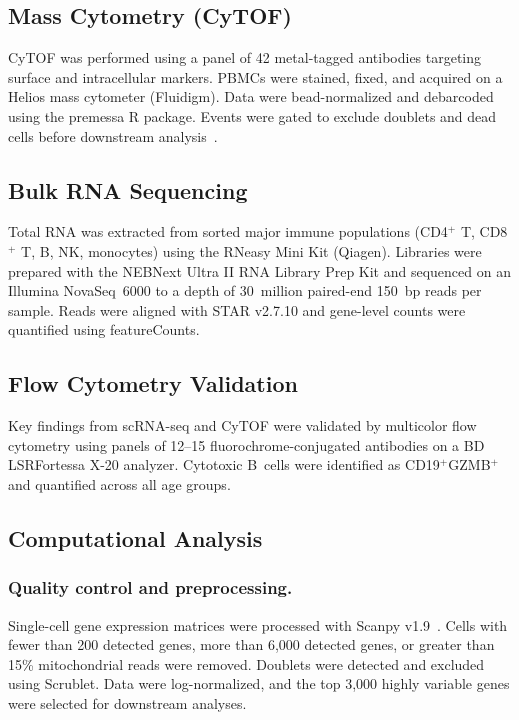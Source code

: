 \documentclass[11pt]{article}
\begin{document}
\subsection{Mass Cytometry (CyTOF)}

CyTOF was performed using a panel of 42 metal-tagged antibodies targeting surface and intracellular markers. PBMCs were stained, fixed, and acquired on a Helios mass cytometer (Fluidigm). Data were bead-normalized and debarcoded using the premessa R package. Events were gated to exclude doublets and dead cells before downstream analysis~\citep{bendall2011single}.

\subsection{Bulk RNA Sequencing}

Total RNA was extracted from sorted major immune populations (CD4$^+$ T, CD8$^+$ T, B, NK, monocytes) using the RNeasy Mini Kit (Qiagen). Libraries were prepared with the NEBNext Ultra II RNA Library Prep Kit and sequenced on an Illumina NovaSeq~6000 to a depth of 30~million paired-end 150~bp reads per sample. Reads were aligned with STAR v2.7.10 and gene-level counts were quantified using featureCounts.

\subsection{Flow Cytometry Validation}

Key findings from scRNA-seq and CyTOF were validated by multicolor flow cytometry using panels of 12--15 fluorochrome-conjugated antibodies on a BD LSRFortessa X-20 analyzer. Cytotoxic B~cells were identified as CD19$^+$GZMB$^+$ and quantified across all age groups.

\subsection{Computational Analysis}

\subsubsection{Quality control and preprocessing.}
Single-cell gene expression matrices were processed with Scanpy v1.9~\citep{wolf2018scanpy}. Cells with fewer than 200 detected genes, more than 6{,}000 detected genes, or greater than 15\% mitochondrial reads were removed. Doublets were detected and excluded using Scrublet. Data were log-normalized, and the top 3{,}000 highly variable genes were selected for downstream analyses.
\end{document}
